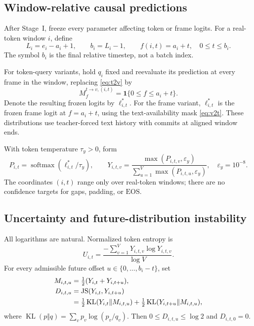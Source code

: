 \documentclass[11pt,a4paper]{article}
\newcommand{\ind}{\mathbf{1}}
\newcommand{\softmax}{\operatorname{softmax}}
\newcommand{\KL}{\operatorname{KL}}
\newcommand{\JS}{\operatorname{JS}}
\newcommand{\EOS}{\mathrm{EOS}}
\newcommand{\eps}{\varepsilon}
\numberwithin{equation}{section}
\begin{document}
\subsection{Window-relative causal predictions}

After Stage~I, freeze every parameter affecting token or frame logits.
For a real-token window $i$, define
\begin{equation}
L_i=e_i-a_i+1,\qquad b_i=L_i-1,\qquad
f(i,t)=a_i+t,\quad 0\leq t\leq b_i.
\end{equation}
The symbol $b_i$ is the final relative timestep, not a batch index.

For token-query variants, hold $q_i$ fixed and reevaluate its prediction
at every frame in the window, replacing \eqref{eq:t2v} by
\begin{equation}
M^{t\to v,(i,t)}_{f}=\ind\{0\leq f\leq a_i+t\}.
\end{equation}
Denote the resulting frozen logits by $\ell^*_{i,t}$. For the frame
variant, $\ell^*_{i,t}$ is the frozen frame logit at $f=a_i+t$,
using the text-availability mask \eqref{eq:v2t}. These distributions
use teacher-forced text history with commits at aligned window ends.

With token temperature $\tau_y>0$, form
\begin{equation}
P_{i,t}=\softmax(\ell^*_{i,t}/\tau_y),\qquad
Y_{i,t,v}=\frac{\max(P_{i,t,v},\eps_y)}
 {\sum_{u=1}^{V}\max(P_{i,t,u},\eps_y)},
\quad \eps_y=10^{-8}.
\label{eq:target-dist}
\end{equation}
The coordinates $(i,t)$ range only over real-token windows; there
are no confidence targets for gaps, padding, or $\EOS$.

\subsection{Uncertainty and future-distribution instability}

All logarithms are natural. Normalized token entropy is
\begin{equation}
U_{i,t}=\frac{-\sum_{v=1}^{V}Y_{i,t,v}\log Y_{i,t,v}}{\log V}.
\label{eq:entropy}
\end{equation}
For every admissible future offset $u\in\{0,\ldots,b_i-t\}$, set
\begin{align}
M_{i,t,u}&=\tfrac12(Y_{i,t}+Y_{i,t+u}),\\
D_{i,t,u}&=\JS(Y_{i,t},Y_{i,t+u})\notag\\
 &=\tfrac12\KL(Y_{i,t}\Vert M_{i,t,u})
   +\tfrac12\KL(Y_{i,t+u}\Vert M_{i,t,u}),
\label{eq:js}
\end{align}
where $\KL(p\Vert q)=\sum_v p_v\log(p_v/q_v)$.
Then $0\leq D_{i,t,u}\leq\log2$ and $D_{i,t,0}=0$.
\end{document}
